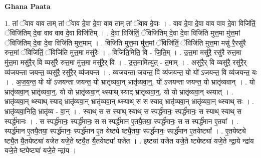 \documentclass[17pt]{extarticle}
\begin{document}
\textbf{Ghana Paata } \newline

1. तां ॅवाव वाव ताम् तां ॅवाव दे॒वा दे॒वा वाव ताम् तां ॅवाव दे॒वाः । . वाव दे॒वा दे॒वा वाव वाव दे॒वा विजि॑तिं॒ ॅविजि॑तिम् दे॒वा वाव वाव दे॒वा विजि॑तिम् । . दे॒वा विजि॑तिं॒ ॅविजि॑तिम् दे॒वा दे॒वा विजि॑ति मुत्त॒मा मु॑त्त॒मां ॅविजि॑तिम् दे॒वा दे॒वा विजि॑ति मुत्त॒माम् । . विजि॑ति मुत्त॒मा मु॑त्त॒मां ॅविजि॑तिं॒ ॅविजि॑ति मुत्त॒मा मसु॑ रै॒रसु॑रै रुत्त॒मां ॅविजि॑तिं॒ ॅविजि॑ति मुत्त॒मा मसु॑रैः । . विजि॑ति॒मिति॒ वि - जि॒ति॒म् । . उ॒त्त॒मा मसु॑रै॒ रसु॑रै रुत्त॒मा मु॑त्त॒मा मसु॑रै॒र् वि व्यसु॑रै रुत्त॒मा मु॑त्त॒मा मसु॑रै॒र् वि । . उ॒त्त॒मामित्यु॑त् - त॒माम् । . असु॑रै॒र् वि व्यसु॑रै॒ रसु॑रै॒र् व्य॑जयन्ता जयन्त॒ व्यसु॑रै॒ रसु॑रै॒र् व्य॑जयन्त । . व्य॑जयन्ता जयन्त॒ वि व्य॑जयन्त॒ यो यो॑ ऽजयन्त॒ वि व्य॑जयन्त॒ यः । . अ॒ज॒य॒न्त॒ यो यो॑ ऽजयन्ता जयन्त॒ यो भ्रातृ॑व्यवा॒न् भ्रातृ॑व्यवा॒न्॒. यो॑ ऽजयन्ता जयन्त॒ यो भ्रातृ॑व्यवान् । . यो भ्रातृ॑व्यवा॒न् भ्रातृ॑व्यवा॒न्॒. यो यो भ्रातृ॑व्यवा॒न् थ्स्याथ् स्याद् भ्रातृ॑व्यवा॒न्॒. यो यो भ्रातृ॑व्यवा॒न् थ्स्यात् । . भ्रातृ॑व्यवा॒न् थ्स्याथ् स्याद् भ्रातृ॑व्यवा॒न् भ्रातृ॑व्यवा॒न् थ्स्याथ् स स स्याद् भ्रातृ॑व्यवा॒न् भ्रातृ॑व्यवा॒न् थ्स्याथ् सः । . भ्रातृ॑व्यवा॒निति॒ भ्रातृ॑व्य - वा॒न् । . स्याथ् स स स्याथ् स्याथ् स स्पर्द्ध॑मानः॒ स्पर्द्ध॑मानः॒ स स्याथ् स्याथ् स स्पर्द्ध॑मानः । . स स्पर्द्ध॑मानः॒ स्पर्द्ध॑मानः॒ स स स्पर्द्ध॑मान ए॒तयै॒तया॒ स्पर्द्ध॑मानः॒ स स स्पर्द्ध॑मान ए॒तया᳚ । . स्पर्द्ध॑मान ए॒तयै॒तया॒ स्पर्द्ध॑मानः॒ स्पर्द्ध॑मान ए॒त येष्ट्ये ष्ट्यै॒तया॒ स्पर्द्ध॑मानः॒ स्पर्द्ध॑मान ए॒तयेष्ट्या᳚ । . ए॒तयेष्ट्ये ष्ट्यै॒त यै॒तयेष्ट्या॑ यजेत यजे॒ते ष्ट्यै॒त यै॒तयेष्ट्या॑ यजेत । . इष्ट्या॑ यजेत यजे॒ते ष्ट्येष्ट्या॑ यजे॒ते न्द्रा॒ये न्द्रा॑य यजे॒ते ष्ट्येष्ट्या॑ यजे॒ते न्द्रा॑य । \newline
\end{document}

